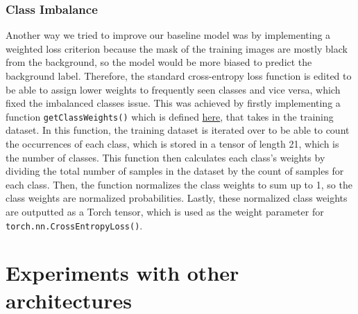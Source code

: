 \documentclass{article}
\begin{document}
\subsubsection{Class Imbalance}
Another way we tried to improve our baseline model was by implementing a weighted loss criterion because the mask of the training images are mostly black from the background, so the model would be more biased to predict the background label. Therefore, the standard cross-entropy loss function is edited to be able to assign lower weights to frequently seen classes and vice versa, which fixed the imbalanced classes issue. This was achieved by firstly implementing a function \texttt{getClassWeights()} which is defined \href{sec:weight_imbalanced_code}{here}, that takes in the training dataset. In this function, the training dataset is iterated over to be able to count the occurrences of each class, which is stored in a tensor of length 21, which is the number of classes. This function then calculates each class's weights by dividing the total number of samples in the dataset by the count of samples for each class. Then, the function normalizes the class weights to sum up to 1, so the class weights are normalized probabilities. Lastly, these normalized class weights are outputted as a Torch tensor, which is used as the weight parameter for \texttt{torch.nn.CrossEntropyLoss()}. 


\section{Experiments with other architectures}
\end{document}
